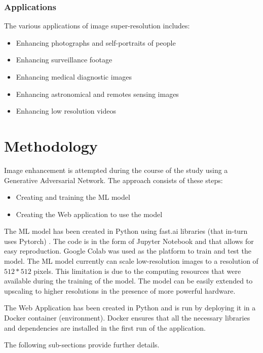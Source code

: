 \documentclass[conference]{IEEEtran}
\begin{document}
			\subsubsection{Applications}\label{srapplications} The various applications of image super-resolution includes:
			\begin{itemize}
				\item Enhancing photographs and self-portraits of people
				\item Enhancing surveillance footage
				\item Enhancing medical diagnostic images
				\item Enhancing astronomical and remotes sensing images
				\item Enhancing low resolution videos
			\end{itemize}
		
	\section{Methodology}
		Image enhancement is attempted during the course of the study using a Generative Adversarial Network. The approach consists of these steps:
		\begin{itemize}
			\item Creating and training the ML model
			\item Creating the Web application to use the model
		\end{itemize}
	 	\par The ML model has been created in Python using fast.ai libraries (that in-turn uses Pytorch) \cite{b7}. The code is in the form of Jupyter Notebook and that allows for easy reproduction. Google Colab was used as the platform to train and test the model. The ML model currently can scale low-resolution images to a resolution of $512 * 512$ pixels. This limitation is due to the computing resources that were available during the training of the model. The model can be easily extended to upscaling to higher resolutions in the presence of more powerful hardware.
	 	\par The Web Application has been created in Python and is run by deploying it in a Docker container (environment). Docker ensures that all the necessary libraries and dependencies are installed in the first run of the application.
	 	\par The following sub-sections provide further details.
	 	
\end{document}
